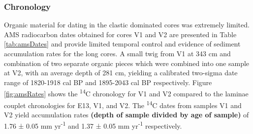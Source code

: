 \documentclass[Royal,times,doublespace,sageh]{sagej}
\begin{document}
\hypertarget{chronology}{%
\subsubsection{Chronology}\label{chronology}}

Organic material for dating in the clastic dominated cores was extremely
limited. AMS radiocarbon dates obtained for cores V1 and V2 are
presented in Table \ref{tab:amsDates} and provide limited temporal
control and evidence of sediment accumulation rates for the long cores.
A small twig from V1 at 343 cm and combination of two separate organic
pieces which were combined into one sample at V2, with an average depth
of 281 cm, yielding a calibrated \citep{Reimer2013} two-sigma date range
of 1820-1918 cal BP and 1895-2043 cal BP respectively. Figure
\ref{fig:amsRates} shows the \textsuperscript{14}C chronology for V1 and
V2 compared to the laminae couplet chronologies for E13, V1, and V2. The
\textsuperscript{14}C dates from samples V1 and V2 yield accumulation
rates \textbf{(depth of sample divided by age of sample)} of 1.76 ± 0.05
mm yr\textsuperscript{-1} and 1.37 ± 0.05 mm yr\textsuperscript{-1}
respectively.
\end{document}
